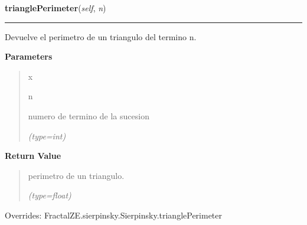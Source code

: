 \hspace{.8\funcindent}\begin{boxedminipage}{\funcwidth}

    \raggedright \textbf{trianglePerimeter}(\textit{self}, \textit{n})

    \vspace{-1.5ex}

    \rule{\textwidth}{0.5\fboxrule}
\setlength{\parskip}{2ex}
    Devuelve el perimetro de un triangulo del termino n.

\setlength{\parskip}{1ex}
      \textbf{Parameters}
      \vspace{-1ex}

      \begin{quote}
        \begin{Ventry}{x}

          \item[n]

          numero de termino de la sucesion

            {\it (type=int)}

        \end{Ventry}

      \end{quote}

      \textbf{Return Value}
    \vspace{-1ex}

      \begin{quote}
      perimetro de un triangulo.

      {\it (type=float)}

      \end{quote}

      Overrides: FractalZE.sierpinsky.Sierpinsky.trianglePerimeter

    \end{boxedminipage}

    \vspace{0.5ex}

